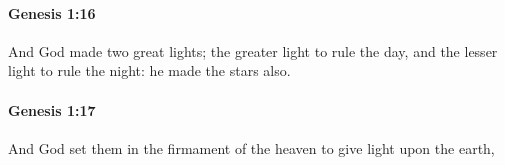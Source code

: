 		\paragraph{Genesis 1:16} %
			\label{GENESIS-1-16}

			And God made two great lights; the greater light to rule the day, and the lesser light to rule the night: he made the stars also.


		\paragraph{Genesis 1:17} %
			\label{GENESIS-1-17}

			And God set them in the firmament of the heaven to give light upon the earth,


